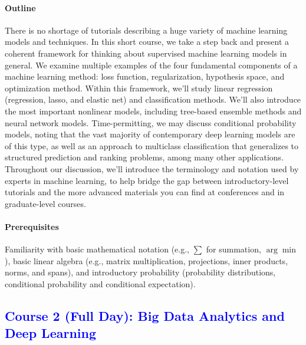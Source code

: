 \documentclass[11pt]{article}
\newcommand{\blue}[1]{{\textcolor{blue}{#1}}}
\begin{document}
\paragraph{Outline}
There is no shortage of tutorials describing a huge variety of machine
learning models and techniques. In this short course, we take a step
back and present a coherent framework for thinking about supervised
machine learning models in general. We examine multiple examples of
the four fundamental components of a machine learning method: loss
function, regularization, hypothesis space, and optimization
method. Within this framework, we'll study linear regression
(regression, lasso, and elastic net) and classification methods. We'll
also introduce the most important nonlinear models, including
tree-based ensemble methods and neural network
models. Time-permitting, we may discuss conditional probability
models, noting that the vast majority of contemporary deep learning
models are of this type, as well as an approach to multiclass
classification that generalizes to structured prediction and ranking
problems, among many other applications. Throughout our discussion,
we'll introduce the terminology and notation used by experts in
machine learning, to help bridge the gap between introductory-level
tutorials and the more advanced materials you can find at conferences
and in graduate-level courses.

\paragraph{Prerequisites}
Familiarity with basic mathematical notation (e.g., $\sum$ for summation,
$\arg\min$), basic linear algebra (e.g., matrix multiplication,
projections, inner products, norms, and spans), and introductory
probability (probability distributions, conditional probability and
conditional expectation).

\subsection*{\blue{Course 2 (Full Day): Big Data Analytics and Deep
  Learning}}
\end{document}
